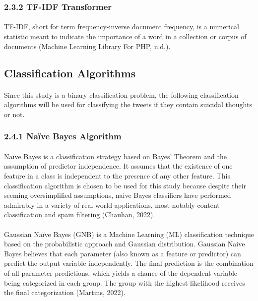 \documentclass[runningheads]{llncs}
\begin{document}
\subsubsection{2.3.2 TF-IDF Transformer}
\paragraph{}
\noindent TF-IDF, short for term frequency-inverse document frequency, is a numerical statistic meant to indicate the importance of a word in a collection or corpus of documents (Machine Learning Library For PHP, n.d.).

\subsection{Classification Algorithms}
\paragraph{}
Since this study is a binary classification problem, the following classification algorithms will be used for classifying the tweets if they contain suicidal thoughts or not.

\subsubsection{2.4.1 Naïve Bayes Algorithm}
\paragraph{}
Naïve Bayes is a classification strategy based on Bayes' Theorem and the assumption of predictor independence. It assumes that the existence of one feature in a class is independent to the presence of any other feature. This classification algorithm is chosen to be used for this study because despite their seeming oversimplified assumptions, naive Bayes classifiers have performed admirably in a variety of real-world applications, most notably content classification and spam filtering (Chauhan, 2022).
\paragraph{}
\paragraph{}
Gaussian Naïve Bayes (GNB) is a Machine Learning (ML) classification technique based on the probabilistic approach and Gaussian distribution. Gaussian Naive Bayes believes that each parameter (also known as a feature or predictor) can predict the output variable independently. The final prediction is the combination of all parameter predictions, which yields a chance of the dependent variable being categorized in each group. The group with the highest likelihood receives the final categorization (Martins, 2022).
\newpage
\end{document}

